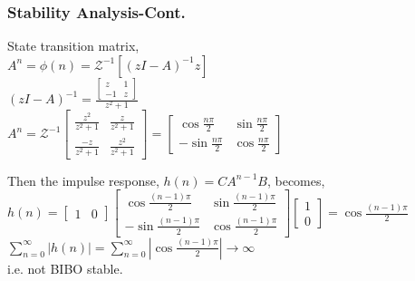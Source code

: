 \documentclass[mathserif, 10pt]{beamer} %
\begin{document}
\frame
{
\normalsize
\frametitle{Stability Analysis-Cont.}

State transition matrix, \\ \vspace{0.05in}
$A^n = \phi(n) = \mathcal{Z}^{-1}\left[( zI-A)^{-1}z\right]$\\ \vspace{0.05in}
$(zI-A)^{-1} = \frac{ \left[
\begin{array}{cc}
	z&1\\
	-1&z
\end{array} \right]}{z^2+1}$ \\
$A^n = \mathcal{Z}^{-1} \left[
\begin{array}{cc}
	\frac{z^2}{z^2+1}&\frac{z}{z^2+1}\\
	\frac{-z}{z^2+1}&\frac{z^2}{z^2+1}
\end{array}\right] = \left[
\begin{array}{cc}
	\cos{\frac{n\pi}{2}} & \sin{\frac{n\pi}{2}}\\
	-\sin{\frac{n\pi}{2}}&\cos{\frac{n\pi}{2}}
\end{array} \right]$\\ \vspace{0.05in}

Then the impulse response, $h(n) = C A^{n-1} B$,  becomes, \\ \vspace{0.05in}
$h(n) = \left[
\begin{array}{cc}
	1&0
\end{array} \right] \left[
\begin{array}{cc}
	\cos{\frac{(n-1)\pi}{2}} & \sin{\frac{(n-1)\pi}{2}}\\
	-\sin{\frac{(n-1)\pi}{2}}&\cos{\frac{(n-1)\pi}{2}}
\end{array} \right] \left[
\begin{array}{c}
	1\\
	0
\end{array} \right] = \cos{\frac{(n-1)\pi}{2}}$\\
$\sum\limits_{n=0}^\infty |h(n)| = \sum\limits_{n=0}^\infty |\cos{\frac{(n-1)\pi}{2}}| \to \infty$\\ \vspace{0.05in}
i.e.  not BIBO stable.

}
\end{document}

